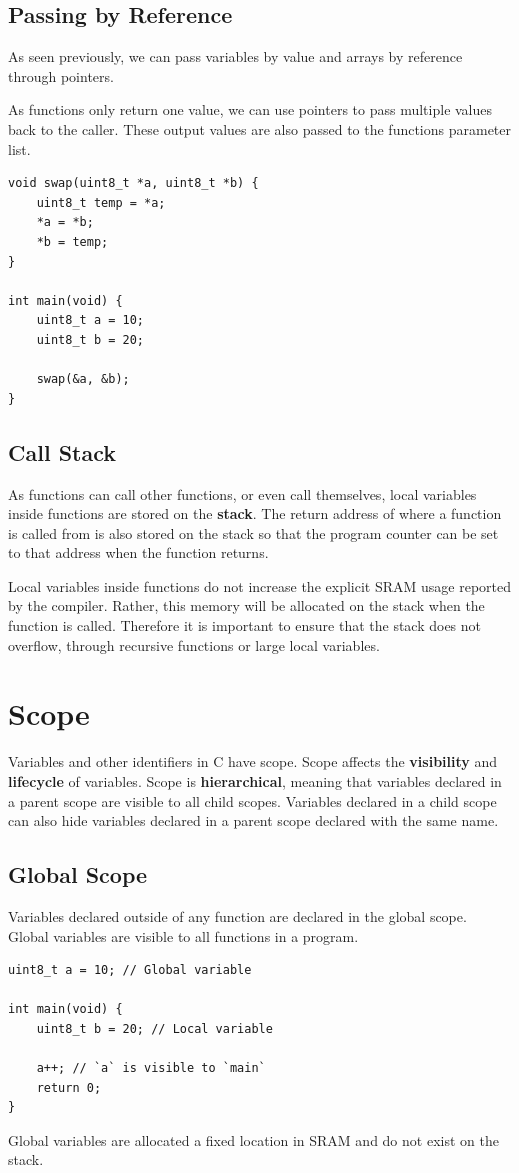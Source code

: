 \documentclass{report}
\begin{document}
\subsection{Passing by Reference}
As seen previously, we can pass variables by value
and arrays by reference through pointers.

As functions only return one value, we can use pointers to pass
multiple values back to the caller. These output values are
also passed to the functions parameter list.
\begin{verbatim}
void swap(uint8_t *a, uint8_t *b) {
    uint8_t temp = *a;
    *a = *b;
    *b = temp;
}

int main(void) {
    uint8_t a = 10;
    uint8_t b = 20;

    swap(&a, &b);
}
\end{verbatim}
\subsection{Call Stack}
As functions can call other functions, or even call themselves,
local variables inside functions are stored on the \textbf{stack}.
The return address of where a function is called from is also stored
on the stack so that the program counter can be set to that address
when the function returns.

Local variables inside functions do not increase the explicit SRAM usage
reported by the compiler. Rather, this memory will be allocated
on the stack when the function is called. Therefore it is
important to ensure that the stack does not overflow, through
recursive functions or large local variables.
\section{Scope}
Variables and other identifiers in C have scope.
Scope affects the \textbf{visibility} and \textbf{lifecycle} of variables.
Scope is \textbf{hierarchical}, meaning that variables declared in a parent scope
are visible to all child scopes.
Variables declared in a child scope can also hide variables
declared in a parent scope declared with the same name.
\subsection{Global Scope}
Variables declared outside of any function are declared in the global scope.
Global variables are visible to all functions in a program.
\begin{verbatim}
uint8_t a = 10; // Global variable

int main(void) {
    uint8_t b = 20; // Local variable

    a++; // `a` is visible to `main`
    return 0;
}
\end{verbatim}
Global variables are allocated a fixed location in SRAM and
do not exist on the stack.
\end{document}
